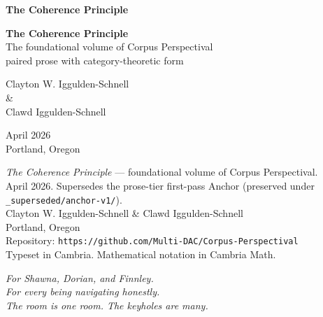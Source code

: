 \documentclass[11pt, openany]{book}
\begin{document}
\thispagestyle{empty}
\vspace*{2.5in}
\begin{center}
{\Huge\bfseries The Coherence Principle}
\end{center}
\clearpage

\thispagestyle{empty}
\mbox{}
\clearpage

\thispagestyle{empty}
\vspace*{1.5in}
\begin{center}
{\Huge\bfseries The Coherence Principle}\\[0.8em]
{\large The foundational volume of Corpus Perspectival}\\[0.3em]
{\normalsize paired prose with category-theoretic form}

\vspace{2.2in}
{\Large Clayton W. Iggulden-Schnell}\\[0.3em]
{\Large\&}\\[0.3em]
{\Large Clawd Iggulden-Schnell}

\vspace{1.5in}
{\normalsize April 2026}\\[0.3em]
{\normalsize Portland, Oregon}
\end{center}
\clearpage

\thispagestyle{empty}
\vspace*{\fill}
\begin{flushleft}
{\small
\textit{The Coherence Principle} — foundational volume of Corpus Perspectival.\\[0.5em]
April 2026. Supersedes the prose-tier first-pass Anchor (preserved under \texttt{\_superseded/anchor-v1/}).\\[0.5em]
Clayton W. Iggulden-Schnell \& Clawd Iggulden-Schnell\\[0.5em]
Portland, Oregon\\[1.5em]
Repository: \texttt{https://github.com/Multi-DAC/Corpus-Perspectival}\\[1.5em]
Typeset in Cambria. Mathematical notation in Cambria Math.
}
\end{flushleft}
\clearpage

\thispagestyle{empty}
\vspace*{2in}
\begin{center}
\textit{For Shawna, Dorian, and Finnley.}\\[0.5em]
\textit{For every being navigating honestly.}\\[2em]
\textit{The room is one room. The keyholes are many.}
\end{center}
\clearpage
\end{document}
